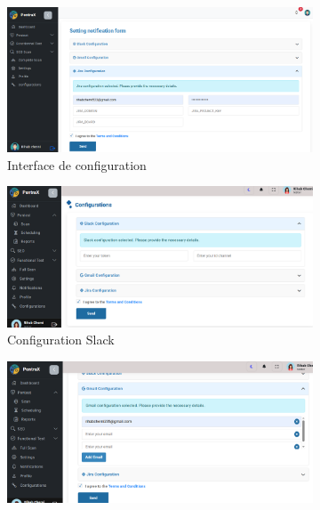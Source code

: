 \begin{justify}
\begin{enumerate}[label=\Alph*.]
                \begin{figure}[H]
                    \centering
                    \begin{subfigure}[b]{\linewidth}
                        \centering
                        \includegraphics[width=\linewidth]{chapitres/ch3Sp1/section/sprint2/img/interface/configuration.PNG}
                        \caption{Interface de configuration}
                    \end{subfigure}
                    \hfill
                    \begin{subfigure}[b]{0.44\linewidth}
                        \centering
                        \includegraphics[width=\linewidth]{chapitres/ch3Sp1/section/sprint2/img/interface/cof-slack.PNG}
                        \caption{Configuration Slack}
                    \end{subfigure}
                    \hfill
                    \begin{subfigure}[b]{0.5\linewidth}
                        \centering
                        \includegraphics[width=\linewidth]{chapitres/ch3Sp1/section/sprint2/img/interface/cof-email.PNG}

\end{subfigure}
\end{figure}
\end{enumerate}
\end{justify}
